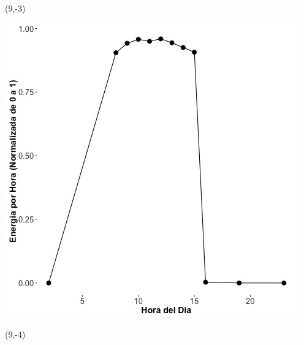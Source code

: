 \documentclass{article}\usepackage[]{graphicx}\usepackage[]{color}
\newenvironment{knitrout}{}{} %
\begin{document}
\begin{textblock}{1}(9,-3)
\begin{minipage}{20em}
\begingroup

\endgroup
\end{minipage}
\end{textblock}

 \vspace{2cm}

\begin{knitrout}
\color{fgcolor}
\includegraphics[scale=0.75]{figure/A6_fplot_norm_median} 
\end{knitrout}

\begin{textblock}{1}(9,-4)
\begin{minipage}{20em}
\begingroup

\endgroup
\end{minipage}
\end{textblock}

\vspace{2cm}
\end{document}

